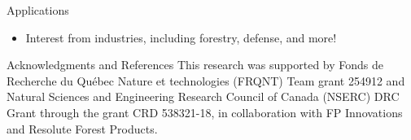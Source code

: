 \documentclass[final,hyperref={pdfpagelabels=false}]{beamer}
\begin{document}
\begin{frame}[t]
\begin{columns}[t]
\begin{column}{.484\textwidth}
\begin{block}{Applications}
\begin{figure}
	\end{figure}
	\begin{itemize}
		\item Interest from industries, including forestry, defense, and more!
	\end{itemize}
\end{block}


\begin{block}{Acknowledgments and References}
	\footnotesize%
	\noindent This research was supported by Fonds de Recherche du Québec Nature et technologies (FRQNT) Team grant 254912 and Natural Sciences and Engineering Research Council of Canada (NSERC) DRC Grant through the grant CRD 538321-18, in collaboration with FP Innovations and Resolute Forest Products.
	{\footnotesize}
\end{block}



%
%
%
%


\end{column} %


\end{columns}
\end{frame}
\end{document}
